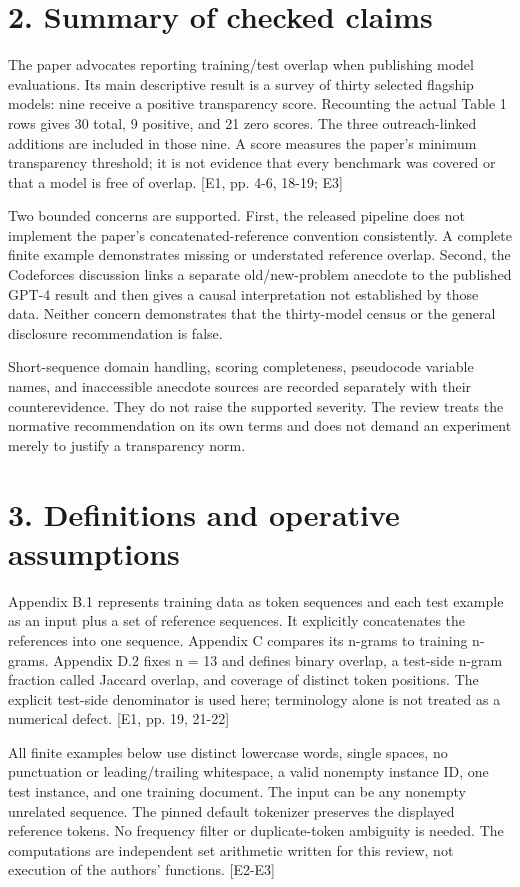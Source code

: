\documentclass[10pt]{article}
\begin{document}
\section*{2. Summary of checked claims}
The paper advocates reporting training/test overlap when publishing model evaluations. Its main descriptive result is a survey of thirty selected flagship models: nine receive a positive transparency score. Recounting the actual Table 1 rows gives 30 total, 9 positive, and 21 zero scores. The three outreach-linked additions are included in those nine. A score measures the paper’s minimum transparency threshold; it is not evidence that every benchmark was covered or that a model is free of overlap. [E1, pp. 4-6, 18-19; E3]\par
Two bounded concerns are supported. First, the released pipeline does not implement the paper’s concatenated-reference convention consistently. A complete finite example demonstrates missing or understated reference overlap. Second, the Codeforces discussion links a separate old/new-problem anecdote to the published GPT-4 result and then gives a causal interpretation not established by those data. Neither concern demonstrates that the thirty-model census or the general disclosure recommendation is false.\par
Short-sequence domain handling, scoring completeness, pseudocode variable names, and inaccessible anecdote sources are recorded separately with their counterevidence. They do not raise the supported severity. The review treats the normative recommendation on its own terms and does not demand an experiment merely to justify a transparency norm.\par
\section*{3. Definitions and operative assumptions}
Appendix B.1 represents training data as token sequences and each test example as an input plus a set of reference sequences. It explicitly concatenates the references into one sequence. Appendix C compares its n-grams to training n-grams. Appendix D.2 fixes n = 13 and defines binary overlap, a test-side n-gram fraction called Jaccard overlap, and coverage of distinct token positions. The explicit test-side denominator is used here; terminology alone is not treated as a numerical defect. [E1, pp. 19, 21-22]\par
All finite examples below use distinct lowercase words, single spaces, no punctuation or leading/trailing whitespace, a valid nonempty instance ID, one test instance, and one training document. The input can be any nonempty unrelated sequence. The pinned default tokenizer preserves the displayed reference tokens. No frequency filter or duplicate-token ambiguity is needed. The computations are independent set arithmetic written for this review, not execution of the authors’ functions. [E2-E3]\par
\end{document}
